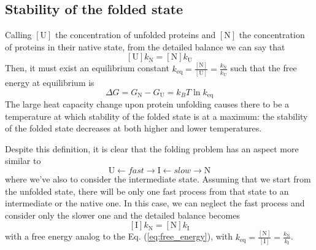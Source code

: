 \subsection{Stability of the folded state}
Calling $\left[\text{U}\right]$ the concentration of unfolded proteins and $\left[\text{N}\right]$ the concentration of proteins in their native state, from the detailed balance we can say that
\begin{equation*}
    \left[\text{U}\right]k_\text{N} = \left[\text{N}\right]k_\text{U}
\end{equation*}
Then, it must exist an equilibrium constant $k_\text{eq} = \frac{\left[\text{N}\right]}{\left[\text{U}\right]} = \frac{k_\text{N}}{k_\text{U}}$ such that the free energy at equilibrium is
\begin{equation}
    \Delta G = G_{\text{N}} - G_{\text{U}} = k_BT\ln k_\text{eq}
    \label{eq:free_energy}
\end{equation}
The large heat capacity change upon protein unfolding causes there to be a temperature at which stability of the folded state is at a maximum: the stability of the folded state decreases at both higher and lower temperatures.

Despite this definition, it is clear that the folding problem has an aspect more similar to
\begin{equation*}
    \text{U} \leftarrow fast \rightarrow \text{I} \leftarrow slow \rightarrow \text{N}
\end{equation*}
where we've also to consider the intermediate state.
Assuming that we start from the unfolded state, there will be only one fast process from that state to an intermediate or the native one.
In this case, we can neglect the fast process and consider only the slower one and the detailed balance becomes
\begin{equation*}
    \left[\text{I}\right]k_\text{N} = \left[\text{N}\right]k_\text{I}
\end{equation*}
with a free energy analog to the Eq. (\ref{eq:free_energy}), with $k_\text{eq} = \frac{\left[\text{N}\right]}{\left[\text{I}\right]} = \frac{k_\text{N}}{k_\text{I}}$.